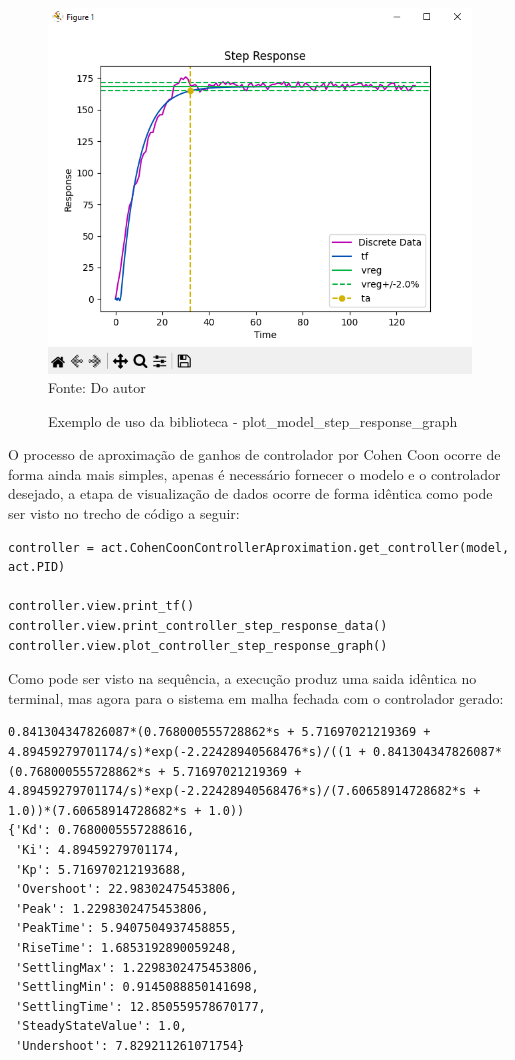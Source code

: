 \begin{figure}[H]
    \centering
    \caption{Exemplo de uso da biblioteca - plot\_model\_step\_response\_graph}
    \includegraphics[scale=0.6]{figuras/get_model_plot}
    \label{fig:get_model_plot}
    \\
    \vspace{0cm}\hspace{0cm}\small{Fonte: Do autor}
\end{figure}

O processo de aproximação de ganhos de controlador por Cohen Coon ocorre de forma ainda mais simples, apenas é
necessário fornecer o modelo e o controlador desejado, a etapa de visualização de dados ocorre de forma
idêntica como pode ser visto no trecho de código a seguir:

\begin{lstlisting}[label={lst:get_controller}]
controller = act.CohenCoonControllerAproximation.get_controller(model, act.PID)

controller.view.print_tf()
controller.view.print_controller_step_response_data()
controller.view.plot_controller_step_response_graph()
\end{lstlisting}

Como pode ser visto na sequência, a execução produz uma saida idêntica no terminal, mas agora para o sistema em malha
fechada com o controlador gerado:

\begin{lstlisting}[label={lst:get_controller_out}]
0.841304347826087*(0.768000555728862*s + 5.71697021219369 + 4.89459279701174/s)*exp(-2.22428940568476*s)/((1 + 0.841304347826087*(0.768000555728862*s + 5.71697021219369 + 4.89459279701174/s)*exp(-2.22428940568476*s)/(7.60658914728682*s + 1.0))*(7.60658914728682*s + 1.0))
{'Kd': 0.7680005557288616,
 'Ki': 4.89459279701174,
 'Kp': 5.716970212193688,
 'Overshoot': 22.98302475453806,
 'Peak': 1.2298302475453806,
 'PeakTime': 5.9407504937458855,
 'RiseTime': 1.6853192890059248,
 'SettlingMax': 1.2298302475453806,
 'SettlingMin': 0.9145088850141698,
 'SettlingTime': 12.850559578670177,
 'SteadyStateValue': 1.0,
 'Undershoot': 7.829211261071754}
\end{lstlisting}

